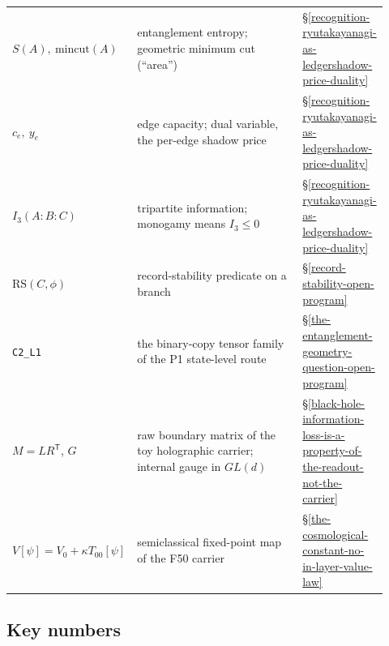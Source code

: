 \begin{center}
\begin{longtable}[]{@{}p{0.27\linewidth}p{0.55\linewidth}p{0.1\linewidth}@{}}
\(S(A),\ \mathrm{mincut}(A)\) & entanglement entropy; geometric minimum cut (``area'') & \S\ref{recognition-ryutakayanagi-as-ledgershadow-price-duality}\\
\(c_e,\ y_e\) & edge capacity; dual variable, the per-edge shadow price & \S\ref{recognition-ryutakayanagi-as-ledgershadow-price-duality}\\
\(I_3(A{:}B{:}C)\) & tripartite information; monogamy means \(I_3\le0\) & \S\ref{recognition-ryutakayanagi-as-ledgershadow-price-duality}\\
\(\mathrm{RS}(C,\phi)\) & record-stability predicate on a branch & \S\ref{record-stability-open-program}\\
\texttt{C2\_L1} & the binary-copy tensor family of the P1 state-level route & \S\ref{the-entanglement-geometry-question-open-program}\\
\(M=LR^{\mathsf T}\), \(G\) & raw boundary matrix of the toy holographic carrier; internal gauge in \(GL(d)\) & \S\ref{black-hole-information-loss-is-a-property-of-the-readout-not-the-carrier}\\
\(V[\psi]=V_0+\kappa T_{00}[\psi]\) & semiclassical fixed-point map of the F50 carrier & \S\ref{the-cosmological-constant-no-in-layer-value-law}\\
\bottomrule
\end{longtable}
\end{center}

\subsection{Key numbers}\label{the-headline-numbers-single-reference-row}

